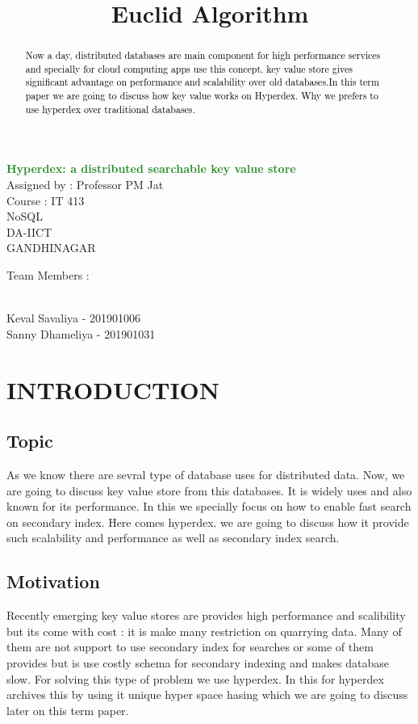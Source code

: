 \documentclass[13pt]{article}
\begin{document}
\title{\textcolor{BurntOrange}{ Euclid Algorithm }}

\begin{center}
\huge
{\bf \textcolor{ForestGreen}{
{  Hyperdex: a distributed searchable key value store }       \\
}
}
\vspace{2 cm}
\huge
{ Assigned by : Professor PM Jat  \\
  Course      : IT 413   \\
  NoSQL \\
  DA-IICT      \\
  GANDHINAGAR  \\
}
\vspace{5 cm}
\LARGE {\it
{
  \begin{center}
      Team Members :
  \end{center}\\
  Keval Savaliya  - 201901006\\
  Sanny Dhameliya - 201901031\\
}
}
\end{center}



\newpage
\begin{abstract}
\textcolor{black}
{
\large
{
 Now a day, distributed databases are main component for high performance services and specially for cloud computing apps use this concept. key value store gives significant advantage on performance and scalability over old databases.In this term paper we are going to discuss  how key value works on Hyperdex. Why we prefers to use hyperdex over traditional databases. 
}
}
\end{abstract}

\large
\section{\textcolor{BurntOrange}{INTRODUCTION}} 
\subsection{Topic}
  As we know there are sevral type of database uses for distributed data. Now, we are going to discuss key value store from this databases. It is widely uses and also known for its performance. In this we specially focus on how to enable fast search on secondary index. Here comes hyperdex. we are going to discuss how it provide such scalability and performance as well as secondary index search.
 \subsection{Motivation} 
  Recently emerging key value stores are provides high performance and scalibility but its come with cost : it is make many restriction on quarrying data. Many of them are not support to use secondary index for searches or some of them provides but is use costly schema for secondary indexing and makes database slow. For solving this type of problem we use hyperdex. In this for hyperdex archives this by using it unique hyper space hasing which we are going to discuss later on this term paper. 
\end{document}
